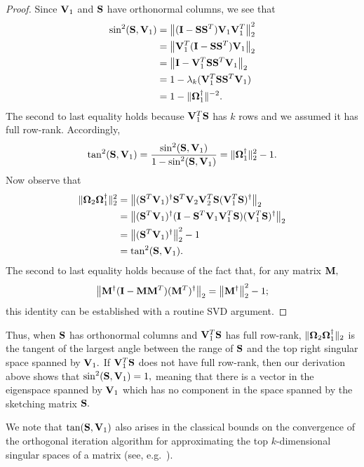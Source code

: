 \begin{proof}
Since $\mathbf{V}_1$ and $\mathbf{S}$
have orthonormal columns, we see that
\begin{align*}
 \sin^2(\mathbf{S}, \mathbf{V}_1) & = 
 \left\|(\mathbf{I} - \mathbf{S} \mathbf{S}^T) \mathbf{V}_1 \mathbf{V}_1^T\right\|_2^2 \\
 & = \left\|\mathbf{V}_1^T (\mathbf{I} - \mathbf{S} \mathbf{S}^T) \mathbf{V}_1\right\|_2 \\
 & = \left\|\mathbf{I} - \mathbf{V}_1^T \mathbf{S} \mathbf{S}^T \mathbf{V}_1\right\|_2 \\
 & = 1 - \lambda_k(\mathbf{V}_1^T \mathbf{S} \mathbf{S}^T \mathbf{V}_1) \\
 & = 1 - \|\mathbf{\Omega}_1^\dagger\|^{-2}.
\end{align*}
The second to last equality holds because $\mathbf{V}_1^T \mathbf{S}$ has $k$ 
rows and we assumed it has full row-rank. Accordingly,
\[
 \tan^2(\mathbf{S}, \mathbf{V}_1) = 
  \frac{\sin^2(\mathbf{S}, \mathbf{V}_1)}{1 - \sin^2(\mathbf{S}, \mathbf{V}_1)} 
  = \|\mathbf{\Omega}_1^\dagger\|_2^2 - 1.
\]
Now observe that 
\begin{align*}
\|\mathbf{\Omega}_2 \mathbf{\Omega}_1^\dagger\|_2^2 & = 
\left\|(\mathbf{S}^T \mathbf{V}_1)^\dagger 
       \mathbf{S}^T \mathbf{V}_2 \mathbf{V}_2^T \mathbf{S}
       (\mathbf{V}_1^T \mathbf{S})^\dagger\right\|_2 \\
& = \left\|(\mathbf{S}^T \mathbf{V}_1)^\dagger 
       (\mathbf{I} - \mathbf{S}^T \mathbf{V}_1 \mathbf{V}_1^T \mathbf{S})
       (\mathbf{V}_1^T \mathbf{S})^\dagger\right\|_2 \\
& = \left\|(\mathbf{S}^T \mathbf{V}_1)^\dagger\right\|_2^2 - 1 \\
& = \tan^2(\mathbf{S}, \mathbf{V}_1).
\end{align*}
The second to last equality holds because of the fact that, for any matrix $\mathbf{M},$
\[
 \left\|\mathbf{M}^\dagger( \mathbf{I} - \mathbf{M} \mathbf{M}^T) (\mathbf{M}^T)^\dagger\right\|_2 =
 \left\|\mathbf{M}^\dagger\right\|_2^2 - 1;
\]
this identity can be established with a routine SVD argument.
\end{proof}

Thus, when $\mathbf{S}$ has orthonormal columns and $\mathbf{V}_1^T \mathbf{S}$ has full
row-rank, $\|\mathbf{\Omega}_2 \mathbf{\Omega}_1^\dagger\|_2$ is the tangent of the
largest angle between the range of $\mathbf{S}$ and the top right singular space spanned by 
$\mathbf{V}_1.$ If $\mathbf{V}_1^T \mathbf{S}$ does not have full row-rank, then our derivation
above shows that $\sin^2(\mathbf{S}, \mathbf{V}_1) = 1,$ meaning that there is a vector
in the eigenspace spanned by $\mathbf{V}_1$ which has no component in the space
spanned by the sketching matrix $\mathbf{S}.$ 

We note that $\tan(\mathbf{S}, \mathbf{V}_1)$ also arises in the classical 
bounds on the convergence of the orthogonal iteration algorithm for approximating
the top $k$-dimensional singular spaces of a matrix (see, e.g.~\cite[Theorem 8.2.2]{GL96}).




